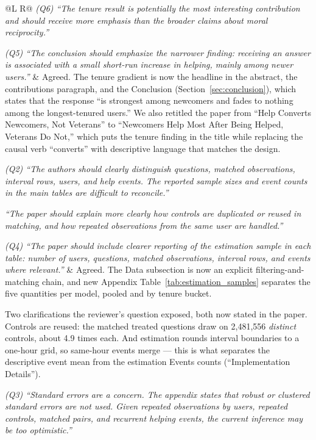 \documentclass[11pt]{article}
\begin{document}
\begin{longtable}{@{}L R@{}}
\textit{(Q6) ``The tenure result is potentially the most interesting contribution and should receive more emphasis than the broader claims about moral reciprocity.''}

\textit{(Q5) ``The conclusion should emphasize the narrower finding: receiving an answer is associated with a small short-run increase in helping, mainly among newer users.''} &
Agreed. The tenure gradient is now the headline in the abstract, the contributions paragraph, and the Conclusion (Section~\ref{sec:conclusion}), which states that the response ``is strongest among newcomers and fades to nothing among the longest-tenured users.'' We also retitled the paper from ``Help Converts Newcomers, Not Veterans'' to ``Newcomers Help Most After Being Helped, Veterans Do Not,'' which puts the tenure finding in the title while replacing the causal verb ``converts'' with descriptive language that matches the design. \\
\midrule

\textit{(Q2) ``The authors should clearly distinguish questions, matched observations, interval rows, users, and help events. The reported sample sizes and event counts in the main tables are difficult to reconcile.''}

\textit{``The paper should explain more clearly how controls are duplicated or reused in matching, and how repeated observations from the same user are handled.''}

\textit{(Q4) ``The paper should include clearer reporting of the estimation sample in each table: number of users, questions, matched observations, interval rows, and events where relevant.''} &
Agreed. The Data subsection is now an explicit filtering-and-matching chain, and new Appendix Table~\ref{tab:estimation_samples} separates the five quantities per model, pooled and by tenure bucket.

Two clarifications the reviewer's question exposed, both now stated in the paper. Controls are reused: the matched treated questions draw on 2{,}481{,}556 \emph{distinct} controls, about 4.9 times each. And estimation rounds interval boundaries to a one-hour grid, so same-hour events merge --- this is what separates the descriptive event mean from the estimation Events counts (``Implementation Details''). \\
\midrule

\textit{(Q3) ``Standard errors are a concern. The appendix states that robust or clustered standard errors are not used. Given repeated observations by users, repeated controls, matched pairs, and recurrent helping events, the current inference may be too optimistic.''}


\end{longtable}
\end{document}

